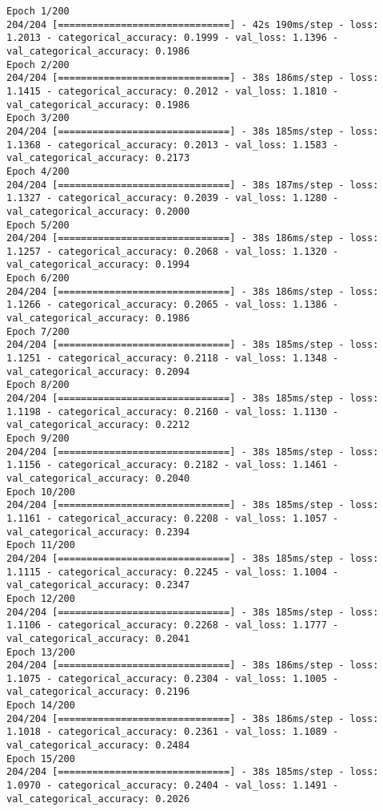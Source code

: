 \begin{lstlisting}
Epoch 1/200
204/204 [==============================] - 42s 190ms/step - loss: 1.2013 - categorical_accuracy: 0.1999 - val_loss: 1.1396 - val_categorical_accuracy: 0.1986
Epoch 2/200
204/204 [==============================] - 38s 186ms/step - loss: 1.1415 - categorical_accuracy: 0.2012 - val_loss: 1.1810 - val_categorical_accuracy: 0.1986
Epoch 3/200
204/204 [==============================] - 38s 185ms/step - loss: 1.1368 - categorical_accuracy: 0.2013 - val_loss: 1.1583 - val_categorical_accuracy: 0.2173
Epoch 4/200
204/204 [==============================] - 38s 187ms/step - loss: 1.1327 - categorical_accuracy: 0.2039 - val_loss: 1.1280 - val_categorical_accuracy: 0.2000
Epoch 5/200
204/204 [==============================] - 38s 186ms/step - loss: 1.1257 - categorical_accuracy: 0.2068 - val_loss: 1.1320 - val_categorical_accuracy: 0.1994
Epoch 6/200
204/204 [==============================] - 38s 186ms/step - loss: 1.1266 - categorical_accuracy: 0.2065 - val_loss: 1.1386 - val_categorical_accuracy: 0.1986
Epoch 7/200
204/204 [==============================] - 38s 185ms/step - loss: 1.1251 - categorical_accuracy: 0.2118 - val_loss: 1.1348 - val_categorical_accuracy: 0.2094
Epoch 8/200
204/204 [==============================] - 38s 185ms/step - loss: 1.1198 - categorical_accuracy: 0.2160 - val_loss: 1.1130 - val_categorical_accuracy: 0.2212
Epoch 9/200
204/204 [==============================] - 38s 185ms/step - loss: 1.1156 - categorical_accuracy: 0.2182 - val_loss: 1.1461 - val_categorical_accuracy: 0.2040
Epoch 10/200
204/204 [==============================] - 38s 185ms/step - loss: 1.1161 - categorical_accuracy: 0.2208 - val_loss: 1.1057 - val_categorical_accuracy: 0.2394
Epoch 11/200
204/204 [==============================] - 38s 185ms/step - loss: 1.1115 - categorical_accuracy: 0.2245 - val_loss: 1.1004 - val_categorical_accuracy: 0.2347
Epoch 12/200
204/204 [==============================] - 38s 185ms/step - loss: 1.1106 - categorical_accuracy: 0.2268 - val_loss: 1.1777 - val_categorical_accuracy: 0.2041
Epoch 13/200
204/204 [==============================] - 38s 186ms/step - loss: 1.1075 - categorical_accuracy: 0.2304 - val_loss: 1.1005 - val_categorical_accuracy: 0.2196
Epoch 14/200
204/204 [==============================] - 38s 186ms/step - loss: 1.1018 - categorical_accuracy: 0.2361 - val_loss: 1.1089 - val_categorical_accuracy: 0.2484
Epoch 15/200
204/204 [==============================] - 38s 185ms/step - loss: 1.0970 - categorical_accuracy: 0.2404 - val_loss: 1.1491 - val_categorical_accuracy: 0.2026

\end{lstlisting}
